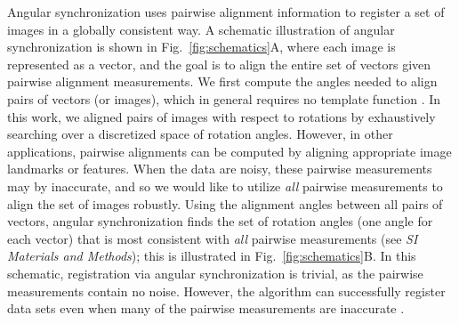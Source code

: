 \documentclass[twocolumn, 10pt]{article}
\newcommand{\SI}[0]{\textit{SI Materials and Methods}}
\newcommand{\fig}[0]{Fig.}
\begin{document}
Angular synchronization uses pairwise alignment information to register a set of images in a globally consistent way.
%
A schematic illustration of angular synchronization is shown in \fig~\ref{fig:schematics}A, where each image is represented as a vector, and the goal is to align the entire set of vectors given pairwise alignment measurements.
%
We first compute the angles needed to align pairs of vectors (or images), which in general requires no template function \citep{ahuja2007template}.
%
In this work, we aligned pairs of images with respect to rotations by exhaustively searching over a discretized space of rotation angles. 
%
However, in other applications, pairwise alignments can be computed by aligning appropriate image landmarks or features. 
%
When the data are noisy, these pairwise measurements may by inaccurate, and so we would like to utilize {\em all} pairwise measurements to align the set of images robustly. 
%
Using the alignment angles between all pairs of vectors, angular synchronization finds the set of rotation angles (one angle for each vector) that is most consistent with {\it all} pairwise measurements (see \SI); this is illustrated in \fig~\ref{fig:schematics}B.
%
In this schematic, registration via angular synchronization is trivial, as the pairwise measurements contain no noise.
%
However, the algorithm can successfully register data sets even when many of the pairwise measurements are inaccurate \citep{singer2011angular}.
\end{document}
